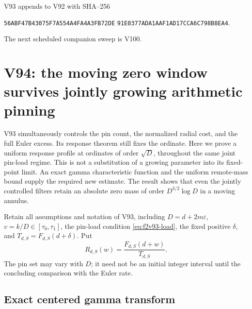 \documentclass[11pt]{article}
\theoremstyle{definition}
\theoremstyle{remark}
\begin{document}
V93 appends to V92 with SHA--256
\begin{center}
\texttt{56ABF47B43075F7A554A4FA4A3FB72DE}\allowbreak
\texttt{91E0377ADA1AAF1AD17CCA6C798B8EA4}.
\end{center}
The next scheduled companion sweep is V100.
\endgroup

\clearpage
\section{V94: the moving zero window survives jointly growing arithmetic pinning}
\label{sec:f2v94-zero-window}
\begingroup
\setcounter{equation}{0}
\renewcommand{\theequation}{N94.\arabic{equation}}
\renewcommand{\theHequation}{f2v94.\arabic{equation}}

V93 simultaneously controls the pin count, the normalized radial cost,
and the full Euler excess.  Its response theorem still fixes the
ordinate.  Here we prove a uniform response profile at ordinates of
order \(\sqrt D\), throughout the same joint pin-load regime.
This is not a substitution of a growing parameter into its fixed-point
limit.  An exact gamma characteristic function and the uniform
remote-mass bound supply the required new estimate.  The result shows
that even the jointly controlled filters retain an absolute zero mass
of order \(D^{3/2}\log D\) in a moving annulus.

Retain all assumptions and notation of V93, including
\(D=d+2m\varepsilon\), \(v=k/D\in[\tau_0,\tau_1]\), the
pin-load condition \eqref{eq:f2v93-load}, the fixed positive \(\delta\),
and \(T_{d,S}=F_{d,S}(d+\delta)\).  Put
\begin{equation}
 R_{d,S}(w)=\frac{F_{d,S}(d+w)}{T_{d,S}}.
 \label{eq:f2v94-response}
\end{equation}
The pin set may vary with \(D\); it need not be an initial integer
interval until the concluding comparison with the Euler rate.

\subsection{Exact centered gamma transform}
\end{document}
